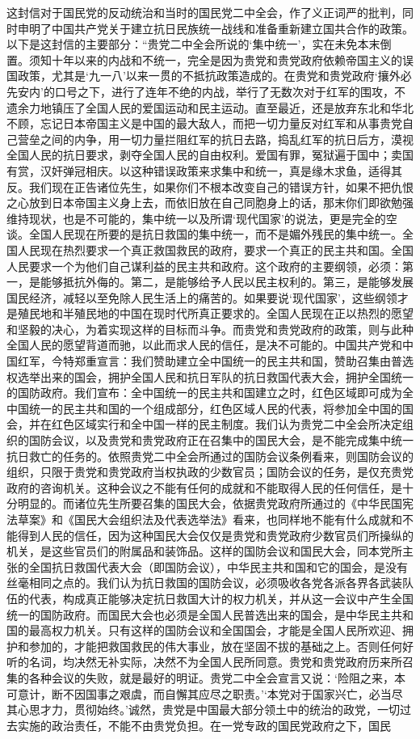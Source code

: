 \begin{maonote}
这封信对于国民党的反动统治和当时的国民党二中全会，作了义正词严的批判，同时申明了中国共产党关于建立抗日民族统一战线和准备重新建立国共合作的政策。以下是这封信的主要部分：“贵党二中全会所说的‘集中统一’，实在未免本末倒置。须知十年以来的内战和不统一，完全是因为贵党和贵党政府依赖帝国主义的误国政策，尤其是‘九一八’以来一贯的不抵抗政策造成的。在贵党和贵党政府‘攘外必先安内’的口号之下，进行了连年不绝的内战，举行了无数次对于红军的围攻，不遗余力地镇压了全国人民的爱国运动和民主运动。直至最近，还是放弃东北和华北不顾，忘记日本帝国主义是中国的最大敌人，而把一切力量反对红军和从事贵党自己营垒之间的内争，用一切力量拦阻红军的抗日去路，捣乱红军的抗日后方，漠视全国人民的抗日要求，剥夺全国人民的自由权利。爱国有罪，冤狱遍于国中；卖国有赏，汉奸弹冠相庆。以这种错误政策来求集中和统一，真是缘木求鱼，适得其反。我们现在正告诸位先生，如果你们不根本改变自己的错误方针，如果不把仇恨之心放到日本帝国主义身上去，而依旧放在自己同胞身上的话，那末你们即欲勉强维持现状，也是不可能的，集中统一以及所谓‘现代国家’的说法，更是完全的空谈。全国人民现在所要的是抗日救国的集中统一，而不是媚外残民的集中统一。全国人民现在热烈要求一个真正救国救民的政府，要求一个真正的民主共和国。全国人民要求一个为他们自己谋利益的民主共和政府。这个政府的主要纲领，必须：第一，是能够抵抗外侮的。第二，是能够给予人民以民主权利的。第三，是能够发展国民经济，减轻以至免除人民生活上的痛苦的。如果要说‘现代国家’，这些纲领才是殖民地和半殖民地的中国在现时代所真正要求的。全国人民现在正以热烈的愿望和坚毅的决心，为着实现这样的目标而斗争。而贵党和贵党政府的政策，则与此种全国人民的愿望背道而驰，以此而求人民的信任，是决不可能的。中国共产党和中国红军，今特郑重宣言：我们赞助建立全中国统一的民主共和国，赞助召集由普选权选举出来的国会，拥护全国人民和抗日军队的抗日救国代表大会，拥护全国统一的国防政府。我们宣布：全中国统一的民主共和国建立之时，红色区域即可成为全中国统一的民主共和国的一个组成部分，红色区域人民的代表，将参加全中国的国会，并在红色区域实行和全中国一样的民主制度。我们认为贵党二中全会所决定组织的国防会议，以及贵党和贵党政府正在召集中的国民大会，是不能完成集中统一抗日救亡的任务的。依照贵党二中全会所通过的国防会议条例看来，则国防会议的组织，只限于贵党和贵党政府当权执政的少数官员；国防会议的任务，是仅充贵党政府的咨询机关。这种会议之不能有任何的成就和不能取得人民的任何信任，是十分明显的。而诸位先生所要召集的国民大会，依据贵党政府所通过的《中华民国宪法草案》和《国民大会组织法及代表选举法》看来，也同样地不能有什么成就和不能得到人民的信任，因为这种国民大会仅仅是贵党和贵党政府少数官员们所操纵的机关，是这些官员们的附属品和装饰品。这样的国防会议和国民大会，同本党所主张的全国抗日救国代表大会（即国防会议），中华民主共和国和它的国会，是没有丝毫相同之点的。我们认为抗日救国的国防会议，必须吸收各党各派各界各武装队伍的代表，构成真正能够决定抗日救国大计的权力机关，并从这一会议中产生全国统一的国防政府。而国民大会也必须是全国人民普选出来的国会，是中华民主共和国的最高权力机关。只有这样的国防会议和全国国会，才能是全国人民所欢迎、拥护和参加的，才能把救国救民的伟大事业，放在坚固不拔的基础之上。否则任何好听的名词，均决然无补实际，决然不为全国人民所同意。贵党和贵党政府历来所召集的各种会议的失败，就是最好的明证。贵党二中全会宣言又说：‘险阻之来，本可意计，断不因国事之艰虞，而自懈其应尽之职责。’‘本党对于国家兴亡，必当尽其心思才力，贯彻始终。’诚然，贵党是中国最大部分领土中的统治的政党，一切过去实施的政治责任，不能不由贵党负担。在一党专政的国民党政府之下，国民
\end{maonote}
